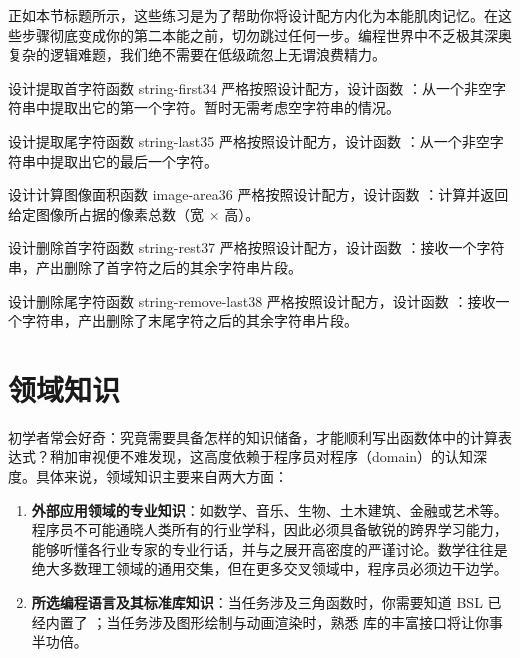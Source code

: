 正如本节标题所示，这些练习是为了帮助你将设计配方内化为本能肌肉记忆。在这些步骤彻底变成你的第二本能之前，切勿跳过任何一步。编程世界中不乏极其深奥复杂的逻辑难题，我们绝不需要在低级疏忽上无谓浪费精力。

\begin{exercise}{设计提取首字符函数 string-first}{34}
严格按照设计配方，设计函数 ：从一个非空字符串中提取出它的第一个字符。暂时无需考虑空字符串的情况。
\end{exercise}

\begin{exercise}{设计提取尾字符函数 string-last}{35}
严格按照设计配方，设计函数 ：从一个非空字符串中提取出它的最后一个字符。
\end{exercise}

\begin{exercise}{设计计算图像面积函数 image-area}{36}
严格按照设计配方，设计函数 ：计算并返回给定图像所占据的像素总数（宽 $\times$ 高）。
\end{exercise}

\begin{exercise}{设计删除首字符函数 string-rest}{37}
严格按照设计配方，设计函数 ：接收一个字符串，产出删除了首字符之后的其余字符串片段。
\end{exercise}

\begin{exercise}{设计删除尾字符函数 string-remove-last}{38}
严格按照设计配方，设计函数 ：接收一个字符串，产出删除了末尾字符之后的其余字符串片段。
\end{exercise}


\section{领域知识}
\label{sec:3.3}

初学者常会好奇：究竟需要具备怎样的知识储备，才能顺利写出函数体中的计算表达式？稍加审视便不难发现，这高度依赖于程序员对程序（domain）的认知深度。具体来说，领域知识主要来自两大方面：
\begin{enumerate}
  \item \textbf{外部应用领域的专业知识}：如数学、音乐、生物、土木建筑、金融或艺术等。程序员不可能通晓人类所有的行业学科，因此必须具备敏锐的跨界学习能力，能够听懂各行业专家的专业行话，并与之展开高密度的严谨讨论。数学往往是绝大多数理工领域的通用交集，但在更多交叉领域中，程序员必须边干边学。
  \item \textbf{所选编程语言及其标准库知识}：当任务涉及三角函数时，你需要知道 BSL 已经内置了 ；当任务涉及图形绘制与动画渲染时，熟悉  库的丰富接口将让你事半功倍。
\end{enumerate}

